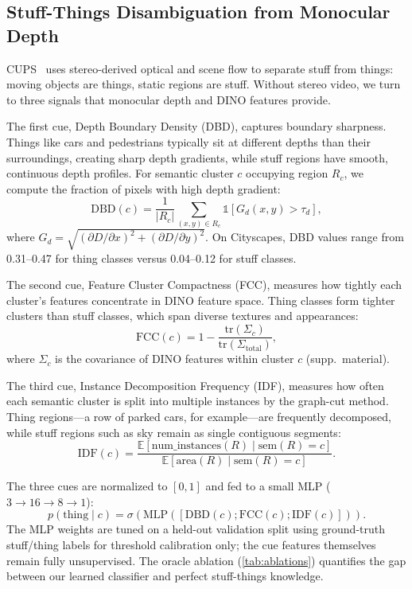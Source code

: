 \documentclass[10pt,twocolumn,letterpaper]{article}
\begin{document}
\subsection{Stuff-Things Disambiguation from Monocular Depth}
\label{sec:stuff_things}

CUPS~\cite{hahn2025cups} uses stereo-derived optical and scene flow to separate stuff from things: moving objects are things, static regions are stuff. Without stereo video, we turn to three signals that monocular depth and DINO features provide.

The first cue, Depth Boundary Density (DBD), captures boundary sharpness. Things like cars and pedestrians typically sit at different depths than their surroundings, creating sharp depth gradients, while stuff regions have smooth, continuous depth profiles. For semantic cluster $c$ occupying region $R_c$, we compute the fraction of pixels with high depth gradient:
\begin{equation}
\text{DBD}(c) = \frac{1}{|R_c|} \!\sum_{(x,y) \in R_c}\! \mathbb{1}\!\left[G_d(x,y) > \tau_d\right],
\label{eq:dbd}
\end{equation}
where $G_d = \sqrt{(\partial D/\partial x)^2 + (\partial D/\partial y)^2}$. On Cityscapes, DBD values range from 0.31--0.47 for thing classes versus 0.04--0.12 for stuff classes.

The second cue, Feature Cluster Compactness (FCC), measures how tightly each cluster's features concentrate in DINO feature space. Thing classes form tighter clusters than stuff classes, which span diverse textures and appearances:
\begin{equation}
\text{FCC}(c) = 1 - \frac{\text{tr}(\Sigma_c)}{\text{tr}(\Sigma_{\text{total}})},
\label{eq:fcc}
\end{equation}
where $\Sigma_c$ is the covariance of DINO features within cluster $c$ (supp.\ material).

The third cue, Instance Decomposition Frequency (IDF), measures how often each semantic cluster is split into multiple instances by the graph-cut method. Thing regions---a row of parked cars, for example---are frequently decomposed, while stuff regions such as sky remain as single contiguous segments:
\begin{equation}
\text{IDF}(c) = \frac{\mathbb{E}[\text{num\_instances}(R) \mid \text{sem}(R) = c]}{\mathbb{E}[\text{area}(R) \mid \text{sem}(R) = c]}.
\label{eq:idf}
\end{equation}

The three cues are normalized to $[0,1]$ and fed to a small MLP ($3 {\to} 16 {\to} 8 {\to} 1$):
\begin{equation}
p(\text{thing} \mid c) = \sigma\!\left(\text{MLP}([\text{DBD}(c); \text{FCC}(c); \text{IDF}(c)])\right).
\label{eq:stc}
\end{equation}
The MLP weights are tuned on a held-out validation split using ground-truth stuff/thing labels for threshold calibration only; the cue features themselves remain fully unsupervised. The oracle ablation (\cref{tab:ablations}) quantifies the gap between our learned classifier and perfect stuff-things knowledge.
\end{document}
